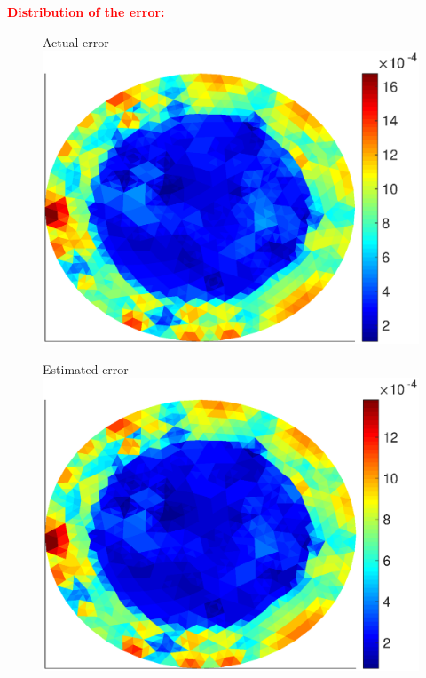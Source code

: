 \documentclass{beamer}
\begin{document}
\begin{frame}
\center\textcolor{red}{\textbf{\LARGE Distribution of the error:}}
\vspace*{1 cm}
\begin{figure}[H]
\begin{minipage}[c]{.5\linewidth}
   \centering
   Actual error
\includegraphics[width=\textwidth]{fig_article/estimator_actual_error_inexact_newton_iter_30second_level.eps}    
\end{minipage}\hfill
\begin{minipage}[c]{.5\linewidth}
   \centering
   Estimated error
\includegraphics[width=\textwidth]{fig_article/energy_norm_second_level_inexact_newton_iter_30.eps}     
\end{minipage}\hfill
\end{figure}

\end{frame}
\end{document}
